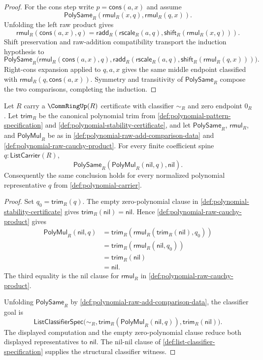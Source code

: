 \begin{proof}
For the cons step write $p=\mathsf{cons}(a,x)$ and assume
$$
\mathsf{PolySame}_R(\mathsf{rmul}_R(x,q),\mathsf{rmul}_R(q,x)).
$$
Unfolding the left raw product gives
$$
\mathsf{rmul}_R(\mathsf{cons}(a,x),q)=
\mathsf{radd}_R(\mathsf{rscale}_R(a,q),\mathsf{shift}_R(\mathsf{rmul}_R(x,q))).
$$
Shift preservation and raw-addition compatibility transport the induction hypothesis to
$$
\mathsf{PolySame}_R\bigl(\mathsf{rmul}_R(\mathsf{cons}(a,x),q),
\mathsf{radd}_R(\mathsf{rscale}_R(a,q),\mathsf{shift}_R(\mathsf{rmul}_R(q,x)))\bigr).
$$
Right-cons expansion applied to $q,a,x$ gives the same middle endpoint classified with $\mathsf{rmul}_R(q,\mathsf{cons}(a,x))$. Symmetry and transitivity of $\mathsf{PolySame}_R$ compose the two comparisons, completing the induction.
\end{proof}

\begin{theorem}
\label{thm:polynomial-multiplication-left-zero-absorption}
Let $R$ carry a $\CommRingUp(R)$ certificate with classifier $\sim_R$ and zero endpoint $0_R$. Let $\mathsf{trim}_R$ be the canonical polynomial trim from \autoref{def:polynomial-pattern-specification} and \autoref{def:polynomial-stability-certificate}, and let $\mathsf{PolySame}_R$, $\mathsf{rmul}_R$, and $\mathsf{PolyMul}_R$ be as in \autoref{def:polynomial-raw-add-comparison-data} and \autoref{def:polynomial-raw-cauchy-product}. For every finite coefficient spine $q:\mathsf{ListCarrier}(R)$,
$$
\mathsf{PolySame}_R(\mathsf{PolyMul}_R(\mathsf{nil},q),\mathsf{nil}).
$$
Consequently the same conclusion holds for every normalized polynomial representative $q$ from \autoref{def:polynomial-carrier}.
\end{theorem}
\begin{proof}
Set $q_0=\mathsf{trim}_R(q)$. The empty zero-polynomial clause in \autoref{def:polynomial-stability-certificate} gives $\mathsf{trim}_R(\mathsf{nil})=\mathsf{nil}$. Hence \autoref{def:polynomial-raw-cauchy-product} gives
$$
\begin{aligned}
\mathsf{PolyMul}_R(\mathsf{nil},q)
&=\mathsf{trim}_R(\mathsf{rmul}_R(\mathsf{trim}_R(\mathsf{nil}),q_0))\\
&=\mathsf{trim}_R(\mathsf{rmul}_R(\mathsf{nil},q_0))\\
&=\mathsf{trim}_R(\mathsf{nil})\\
&=\mathsf{nil}.
\end{aligned}
$$
The third equality is the nil clause for $\mathsf{rmul}_R$ in \autoref{def:polynomial-raw-cauchy-product}.

Unfolding $\mathsf{PolySame}_R$ by \autoref{def:polynomial-raw-add-comparison-data}, the classifier goal is
$$
\mathsf{ListClassifierSpec}\bigl(\sim_R,\mathsf{trim}_R(\mathsf{PolyMul}_R(\mathsf{nil},q)),\mathsf{trim}_R(\mathsf{nil})\bigr).
$$
The displayed computation and the empty zero-polynomial clause reduce both displayed representatives to $\mathsf{nil}$. The nil-nil clause of \autoref{def:list-classifier-specification} supplies the structural classifier witness.
\end{proof}


